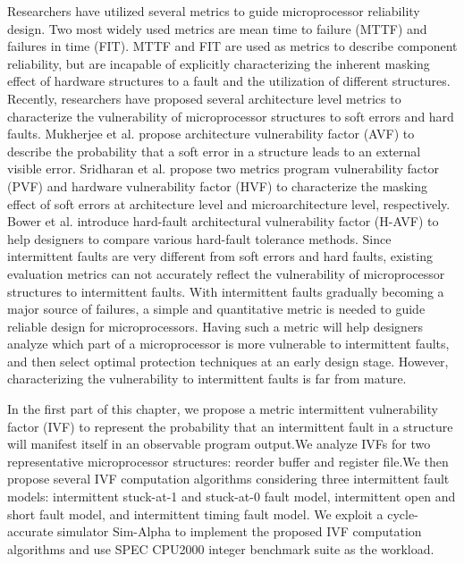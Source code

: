 Researchers have utilized several metrics to guide microprocessor reliability design. Two most widely used metrics are mean time to failure (MTTF) and failures in time (FIT). MTTF and FIT are used as metrics to describe component reliability, but are incapable of explicitly characterizing the inherent masking effect of hardware structures to a fault and the utilization of different structures. Recently, researchers have proposed several architecture level metrics to characterize the vulnerability of microprocessor structures to soft errors and hard faults. Mukherjee et al. \cite{mukherjee2003systematic} propose architecture vulnerability factor (AVF) to describe the probability that a soft error in a structure leads to an external visible error. Sridharan et al. \cite{sridharan2009eliminating} \cite{sridharan2010using} propose two metrics program vulnerability factor (PVF) and hardware vulnerability factor (HVF) to characterize the masking effect of soft errors at architecture level and microarchitecture level, respectively. Bower et al. \cite{bower2006applying} introduce hard-fault architectural vulnerability factor (H-AVF) to help designers to compare various hard-fault tolerance methods. Since intermittent faults are very different from soft errors and hard faults, existing evaluation metrics can not accurately reflect the vulnerability of microprocessor structures to intermittent faults. With intermittent faults gradually becoming a major source of failures, a simple and quantitative metric is needed to guide reliable design for microprocessors. Having such a metric will help designers analyze which part of a microprocessor is more vulnerable to intermittent faults, and then select optimal protection techniques at an early design stage. However, characterizing the vulnerability to intermittent faults is far from mature.

In the first part of this chapter, we propose a metric intermittent vulnerability factor (IVF) to represent the probability that an intermittent fault in a structure will manifest itself in an observable program output.We analyze IVFs for two representative microprocessor structures: reorder buffer and register file.We then propose several IVF computation algorithms considering three intermittent fault models: intermittent stuck-at-1 and stuck-at-0 fault model, intermittent open and short fault model, and intermittent timing fault model. We exploit a cycle-accurate simulator Sim-Alpha to implement the proposed IVF computation algorithms and use SPEC CPU2000 integer benchmark suite as the workload.

